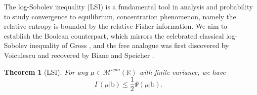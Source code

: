 \documentclass[10pt, reqno]{amsart}
\numberwithin{equation}{section}
\theoremstyle{definition}
\theoremstyle{plain}
\newtheorem{theorem}[definition]{Theorem}
\theoremstyle{remark}
\newcommand{\R}{\mathbb{R}}
\newcommand{\1}{\mathbbm{1}}
\begin{document}
	The log-Sobolev inequality (LSI) is a fundamental tool in analysis and probability to study convergence to equilibrium, concentration phenomenon, namely the relative entropy is bounded by the relative Fisher information. We aim to establish the Boolean counterpart, which mirrors the celebrated classical log-Sobolev inequality of Gross \cite{gross1975logarithmic}, and the free analogue was first discovered by Voiculescu \cite{voiculescu1998analogues} and recovered by Biane and Speicher \cite{biane2001free}.
	\begin{theorem}[LSI]\label{thm:LSI}
		For any $\mu\in\mathcal{M}^{sym}(\R)$ with finite variance, we have
		\begin{equation}\label{ineq:LSI}
		   \Gamma(\mu|\mathbb{\mathrm{b}})\leq \frac{1}{2}\Psi(\mu| \mathbb{\mathrm{b}}).
	    \end{equation}
	\end{theorem}
\end{document}
